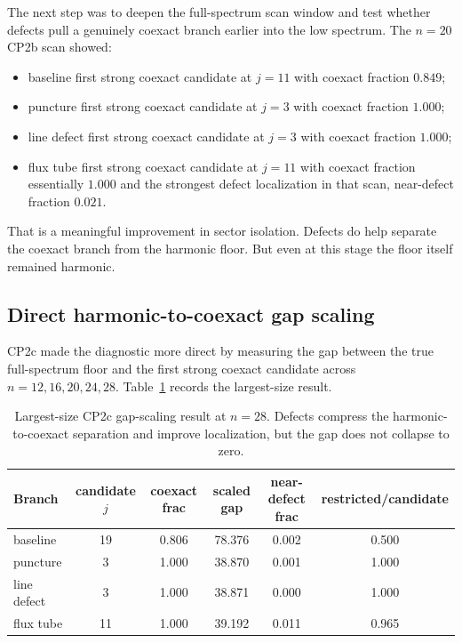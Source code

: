 \documentclass[11pt]{article}
\begin{document}
The next step was to deepen the full-spectrum scan window and test whether defects pull a genuinely coexact branch earlier into the low spectrum. The $n=20$ CP2b scan showed:
\begin{itemize}
\item baseline first strong coexact candidate at $j=11$ with coexact fraction $0.849$;
\item puncture first strong coexact candidate at $j=3$ with coexact fraction $1.000$;
\item line defect first strong coexact candidate at $j=3$ with coexact fraction $1.000$;
\item flux tube first strong coexact candidate at $j=11$ with coexact fraction essentially $1.000$ and the strongest defect localization in that scan, near-defect fraction $0.021$.
\end{itemize}

That is a meaningful improvement in sector isolation. Defects do help separate the coexact branch from the harmonic floor. But even at this stage the floor itself remained harmonic.

\subsection{Direct harmonic-to-coexact gap scaling}

CP2c made the diagnostic more direct by measuring the gap between the true full-spectrum floor and the first strong coexact candidate across $n=12,16,20,24,28$. Table~\ref{tab:cp2c-n28} records the largest-size result.

\begin{table}[t]
\centering
\small
\begin{tabular}{lccccc}
\toprule
Branch & candidate $j$ & coexact frac & scaled gap & near-defect frac & restricted/candidate \\
\midrule
baseline & 19 & 0.806 & 78.376 & 0.002 & 0.500 \\
puncture & 3 & 1.000 & 38.870 & 0.001 & 1.000 \\
line defect & 3 & 1.000 & 38.871 & 0.000 & 1.000 \\
flux tube & 11 & 1.000 & 39.192 & 0.011 & 0.965 \\
\bottomrule
\end{tabular}
\caption{Largest-size CP2c gap-scaling result at $n=28$. Defects compress the harmonic-to-coexact separation and improve localization, but the gap does not collapse to zero.}
\label{tab:cp2c-n28}
\end{table}
\end{document}
